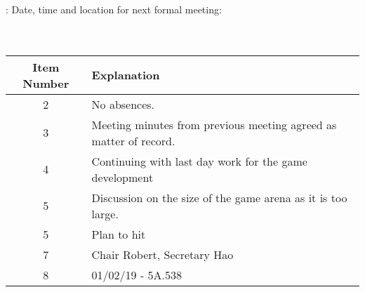\documentclass{article}
\begin{document}
: Date, time and location for next formal meeting: \\\\ \indent  \\
\begin{table}[H]
	\centering
	\begin{tabular}{| c | p{9cm} |}
		\hline
		Item Number & Explanation \\ \hline
		2 & No absences.\\ \hline
		3 & Meeting minutes from previous meeting agreed as matter of record. \\ \hline
		4 & Continuing with last day work for the game development  \\ \hline
		5 & Discussion on the size of the game arena as it is too large. \\ \hline
		5 & Plan to hit  \\ \hline
		7 & Chair Robert, Secretary Hao\\ \hline
		8 & 01/02/19 - 5A.538   \\ \hline

		
	\end{tabular}
\end{table}
\end{document}
